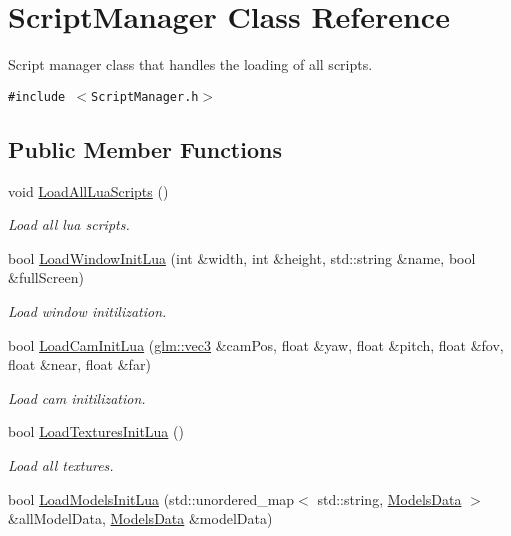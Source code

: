 \hypertarget{class_script_manager}{
\section{ScriptManager Class Reference}
\label{class_script_manager}
}
Script manager class that handles the loading of all scripts.  


{\tt \#include $<$ScriptManager.h$>$}

\subsection*{Public Member Functions}
\begin{CompactItemize}
\item 
void \hyperlink{class_script_manager_5dbb77caa57366fc35feaaecc9c11032}{LoadAllLuaScripts} ()
\begin{CompactList}\small\item\em Load all lua scripts. \item\end{CompactList}\item 
bool \hyperlink{class_script_manager_a44d4ea00ccf0edb0cda447e084b3efc}{LoadWindowInitLua} (int \&width, int \&height, std::string \&name, bool \&fullScreen)
\begin{CompactList}\small\item\em Load window initilization. \item\end{CompactList}\item 
bool \hyperlink{class_script_manager_c8b552d0d8d0550e4425fcdaebee2ced}{LoadCamInitLua} (\hyperlink{group__core__types_g1c47e8b3386109bc992b6c48e91b0be7}{glm::vec3} \&camPos, float \&yaw, float \&pitch, float \&fov, float \&near, float \&far)
\begin{CompactList}\small\item\em Load cam initilization. \item\end{CompactList}\item 
bool \hyperlink{class_script_manager_ad8b6e301a1718048869040f83689ec1}{LoadTexturesInitLua} ()
\begin{CompactList}\small\item\em Load all textures. \item\end{CompactList}\item 
bool \hyperlink{class_script_manager_6d85eb0c7b7cdb99e4e6d98300cf47c8}{LoadModelsInitLua} (std::unordered\_\-map$<$ std::string, \hyperlink{struct_models_data}{ModelsData} $>$ \&allModelData, \hyperlink{struct_models_data}{ModelsData} \&modelData)

\end{CompactItemize}
